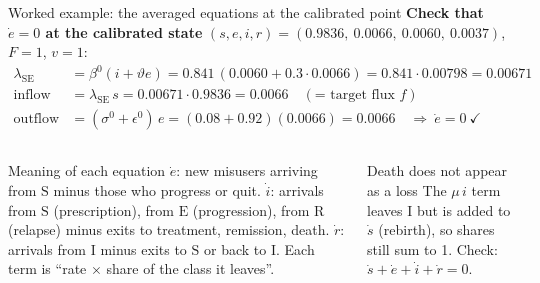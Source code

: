 ﻿\documentclass[9pt,aspectratio=169]{beamer}
\newcommand{\Sc}{\mathrm{S}}\newcommand{\Ec}{\mathrm{E}}\newcommand{\Ic}{\mathrm{I}}\newcommand{\Rc}{\mathrm{R}}\newcommand{\Dc}{\mathrm{D}}
\begin{document}
\begin{frame}{Worked example: the averaged equations at the calibrated point}
 \textbf{Check that $\dot e=0$ at the calibrated state} $(s,e,i,r)=(0.9836,\ 0.0066,\ 0.0060,\ 0.0037)$, $F=1$, $v=1$:
 \begin{align*}
  \lambda_{\Sc\Ec}&=\beta^0(i+\vartheta e)=0.841\,(0.0060+0.3\cdot0.0066)=0.841\cdot0.00798=0.00671\\
  \text{inflow to E}&=\lambda_{\Sc\Ec}\,s=0.00671\cdot0.9836=\mathbf{0.0066}\quad(\text{= target flux }f)\\
  \text{outflow from E}&=(\sigma^0+\epsilon^0)\,e=(0.08+0.92)(0.0066)=\mathbf{0.0066}\quad\Rightarrow\ \dot e=0\ \checkmark
 \end{align*}
 \begin{columns}[T]
 \begin{block}{Meaning of each equation}\small
  $\dot e$: new misusers arriving from $\Sc$ minus those who progress or quit. $\dot i$: arrivals from $\Sc$ (prescription), from $\Ec$ (progression), from $\Rc$ (relapse) minus exits to treatment, remission, death. $\dot r$: arrivals from $\Ic$ minus exits to $\Sc$ or back to $\Ic$. Each term is ``rate $\times$ share of the class it leaves''.
 \end{block}
 \begin{block}{Death does not appear as a loss}\small
  The $\mu\,i$ term leaves $\Ic$ but is added to $\dot s$ (rebirth), so shares still sum to 1. Check: $\dot s+\dot e+\dot i+\dot r=0$.
 \end{block}
 \end{columns}
\end{frame}
\end{document}

